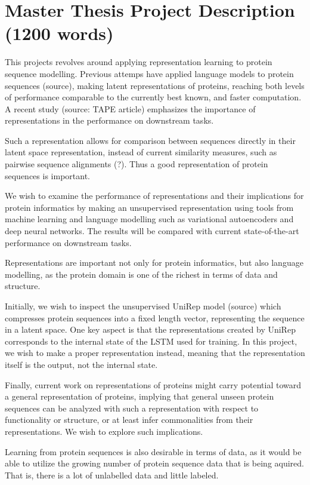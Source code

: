 \documentclass[a4paper,11pt]{article}
\begin{document}
\section*{Master Thesis Project Description (1200 words)}
This projects revolves around applying representation learning to protein sequence modelling. Previous attemps have applied language models to protein sequences (source), making latent representations of proteins, reaching both levels of performance comparable to the currently best known, and faster computation. A recent study (source: TAPE article) emphasizes the importance of representations in the performance on downstream tasks.

Such a representation allows for comparison between sequences directly in their latent space representation, instead of current similarity measures, such as pairwise sequence alignments (?). Thus a good representation of protein sequences is important.

We wish to examine the performance of representations and their implications for protein informatics by making an unsupervised representation using tools from machine learning and language modelling such as variational autoencoders and deep neural networks. The results will be compared with current state-of-the-art performance on downstream tasks.

Representations are important not only for protein informatics, but also language modelling, as the protein domain is one of the richest in terms of data and structure.

Initially, we wish to inspect the unsupervised UniRep model (source) which compresses protein sequences into a fixed length vector, representing the sequence in a latent space. One key aspect is that the representations created by UniRep corresponds to the internal state of the LSTM used for training. In this project, we wish to make a proper representation instead, meaning that the representation itself is the output, not the internal state. 

Finally, current work on representations of proteins might carry potential toward a general representation of proteins, implying that general unseen protein sequences can be analyzed with such a representation with respect to functionality or structure, or at least infer commonalities from their representations. We wish to explore such implications.

Learning from protein sequences is also desirable in terms of data, as it would be able to utilize the growing number of protein sequence data that is being aquired. That is, there is a lot of unlabelled data and little labeled.
\end{document}

